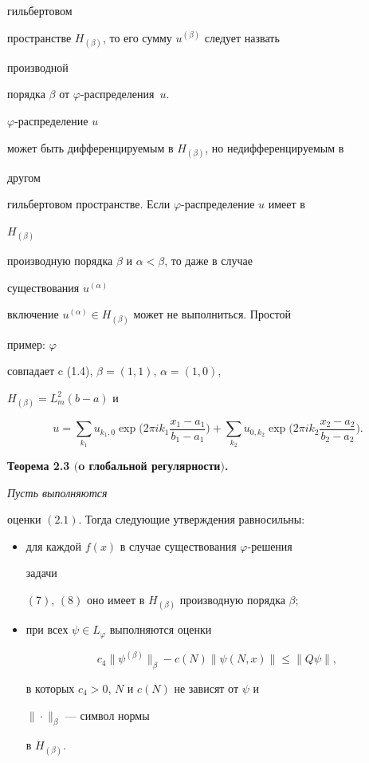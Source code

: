 гильбертовом 


пространстве $H_{(\beta)}$, то его сумму $u^{(\beta)}$ следует назвать 


производной 


порядка $\beta$ от $\varphi$-рас\-пре\-де\-ле\-ния~$u$.\; 


$\varphi$-распределение $u$ 


может быть дифференцируемым в $H_{(\beta)}$, но недифференцируемым в 


другом  


гильбертовом пространстве. Если $\varphi$-распределение $u$ имеет в 


$H_{(\beta)}$ 


производную порядка $\beta$ и $\alpha<\beta$, то даже в случае 


существования $u^{(\alpha)}$ 


включение $u^{(\alpha)}\in H_{(\beta)}$ может не выполниться. Простой 


пример: $\varphi$ 


совпадает c (1.4), $\beta=(1,1)$, $\alpha=(1,0)$, 


$H_{(\beta)}=L^2_m(b-a)$ и 


$$ 


u=\sum_{k_1}u_{k_1,0}\exp\bigg(2\pi i k_1 


\frac{x_1-a_1}{b_1-a_1}\bigg)+\sum_{k_2}u_{0,k_2}\exp 


\bigg(2\pi i k_2\frac{x_2-a_2}{b_2-a_2}\bigg). 


$$ 


 


{\bf Теорема 2.3 $($o глобальной регулярности$)$.} {\it Пусть выполняются  


оценки $(2.1)$. Тогда следующие утверждения равносильны$:$ 


\begin{itemize} 


\item[1.] для каждой $f(x)$ в случае существования $\varphi$-решения 


задачи  


$(7)$, $(8)$ оно имеет в $H_{(\beta)}$ производную порядка $\beta;$ 


\item[2.] при всех $\psi\in L_\varphi$ выполняются оценки  


\begin{equation} 


c_4\|\psi^{(\beta)}\|_\beta-c(N)\|\psi(N,x)\|\le 


\|Q\psi\|, 


\end{equation} 


в которых $c_4>0$, $N$ и $c(N)$ не зависят от $\psi$ и 


$\|\cdot\|_\beta$ --- символ нормы 


в $H_{(\beta)}$.


\end{itemize} 


} 


